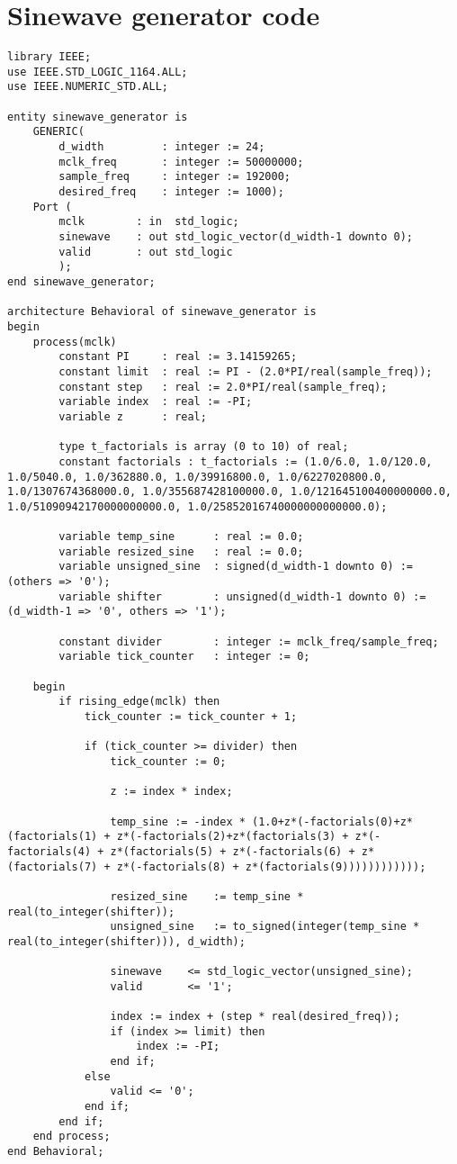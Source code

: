 \section*{Sinewave generator code}
\begin{lstlisting}
library IEEE;
use IEEE.STD_LOGIC_1164.ALL;
use IEEE.NUMERIC_STD.ALL;

entity sinewave_generator is
    GENERIC(
        d_width         : integer := 24;
        mclk_freq       : integer := 50000000;
        sample_freq     : integer := 192000;
        desired_freq    : integer := 1000);
    Port (
        mclk        : in  std_logic;
        sinewave    : out std_logic_vector(d_width-1 downto 0);
        valid       : out std_logic
        ); 
end sinewave_generator;

architecture Behavioral of sinewave_generator is
begin
    process(mclk)
        constant PI     : real := 3.14159265;
        constant limit  : real := PI - (2.0*PI/real(sample_freq));
        constant step   : real := 2.0*PI/real(sample_freq);
        variable index  : real := -PI;
        variable z      : real;

        type t_factorials is array (0 to 10) of real;
        constant factorials : t_factorials := (1.0/6.0, 1.0/120.0, 1.0/5040.0, 1.0/362880.0, 1.0/39916800.0, 1.0/6227020800.0, 1.0/1307674368000.0, 1.0/355687428100000.0, 1.0/121645100400000000.0, 1.0/51090942170000000000.0, 1.0/25852016740000000000000.0);

        variable temp_sine      : real := 0.0;
        variable resized_sine   : real := 0.0;
        variable unsigned_sine  : signed(d_width-1 downto 0) := (others => '0');
        variable shifter        : unsigned(d_width-1 downto 0) := (d_width-1 => '0', others => '1');

        constant divider        : integer := mclk_freq/sample_freq;
        variable tick_counter   : integer := 0;

    begin
        if rising_edge(mclk) then
            tick_counter := tick_counter + 1;

            if (tick_counter >= divider) then
                tick_counter := 0;

                z := index * index;

                temp_sine := -index * (1.0+z*(-factorials(0)+z*(factorials(1) + z*(-factorials(2)+z*(factorials(3) + z*(-factorials(4) + z*(factorials(5) + z*(-factorials(6) + z*(factorials(7) + z*(-factorials(8) + z*(factorials(9))))))))))));

                resized_sine    := temp_sine * real(to_integer(shifter));
                unsigned_sine   := to_signed(integer(temp_sine * real(to_integer(shifter))), d_width);

                sinewave    <= std_logic_vector(unsigned_sine);
                valid       <= '1';

                index := index + (step * real(desired_freq));
                if (index >= limit) then
                    index := -PI;
                end if;
            else
                valid <= '0';
            end if;
        end if;
    end process;
end Behavioral;
\end{lstlisting}